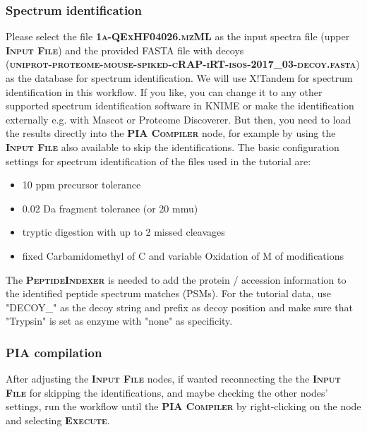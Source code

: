 \documentclass[a4paper,11pt,twoside]{article}
\newcommand{\menu}[1]{{\scshape\bfseries #1}}
\newcommand{\filepath}[1]{{\scshape\bfseries #1}}
\newcommand{\knimenode}[1]{{\scshape\bfseries #1}}
\begin{document}
\subsubsection{Spectrum identification}

Please select the file \filepath{1a-QExHF04026.mzML} as the input spectra file
(upper \knimenode{Input File}) and the provided FASTA file with decoys \\
(\filepath{uniprot-proteome-mouse-spiked-cRAP-iRT-isos-2017\_03-decoy.fasta})
as the database for spectrum identification. We will use X!Tandem for spectrum
identification in this workflow. If you like, you can change it to any other
supported spectrum identification software in KNIME or make the identification
externally e.g. with Mascot or Proteome Discoverer. But then, you need to load
the results directly into the \knimenode{PIA Compiler} node, for example by
using the \knimenode{Input File} also available to skip the identifications.
The basic configuration settings for spectrum identification of the files used
in the tutorial are:

\begin{itemize}
	\item 10 ppm precursor tolerance
	\item 0.02 Da fragment tolerance (or 20 mmu)
	\item tryptic digestion with up to 2 missed cleavages
	\item fixed Carbamidomethyl of C and variable Oxidation of M of modifications
\end{itemize}

The \knimenode{PeptideIndexer} is needed to add the protein / accession
information to the identified peptide spectrum matches (PSMs). For the tutorial
data, use "DECOY\_" as the decoy string and prefix as decoy position and make
sure that "Trypsin" is set as enzyme with "none" as specificity.


\subsubsection{PIA compilation}
\label{pia_compilation}

After adjusting the \knimenode{Input File} nodes, if wanted reconnecting the
the \knimenode{Input File} for skipping the identifications, and maybe checking
the other nodes' settings, run the workflow until the \knimenode{PIA Compiler}
by right-clicking on the node and selecting \menu{Execute}.
\end{document}
